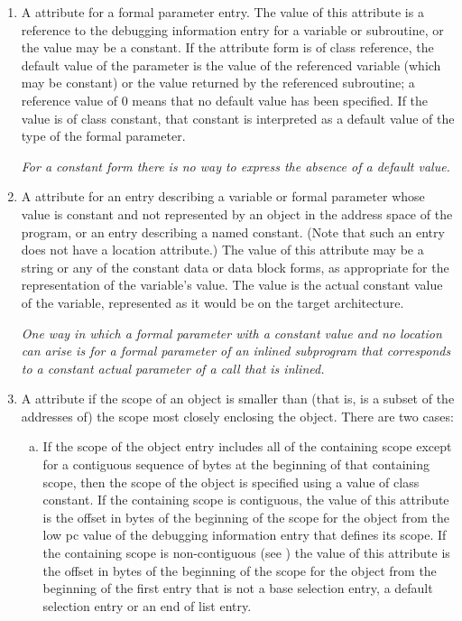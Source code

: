 \begin{enumerate}[1. ]
\item A \DWATdefaultvalue{} attribute 
for 
a formal parameter
\hypertarget{chap:DWATdefaultvaluedefaultvalueofparameter}{}
entry. The value of this attribute is a reference to the
debugging information entry for a variable or subroutine,
or the value may be a constant. If the attribute form is of
class reference, the default value of the parameter is the
value of the referenced variable (which may be constant) or
the value returned by the referenced subroutine; a reference
value of 0 means that no default value has been specified.
If the value is of class constant, that constant is interpreted
as a default value of the type of the formal parameter.

\textit{For a constant form there is no way to 
express the absence of a default value.}

\item A \DWATconstvalue{} attribute 
for 
\hypertarget{chap:DWATconstvalueconstantobject}{}
an entry describing a
variable or formal parameter whose value is constant and not
represented by an object in the address space of the program,
or an entry describing a named constant. (Note that such
an entry does not have a location attribute.) The value of
this attribute may be a string or any of the constant data
or data block forms, 
as appropriate for the representation
of the variable's value. The value is the actual constant
value of the variable, represented as it would be on the
target architecture.  

\textit{One way in which a formal parameter
with a constant value and no location can arise is for a
formal parameter of an inlined subprogram that corresponds
to a constant actual parameter of a call that is inlined.
}

\item A \DWATstartscope{} 
attribute if the scope of 
an
\hypertarget{chap:DWATstartscopeobjectdeclaration}{}
object is smaller than (that is, is a subset of the addresses
of) the scope most closely enclosing the object. There are
two cases:
\begin{enumerate}[a) ]
\item If the scope of the object entry includes all of the
containing scope except for a contiguous sequence of bytes at
the beginning of that containing scope, then the scope of the
object is specified using a value of class constant. If the
containing scope is contiguous, the value of this attribute
is the offset in bytes of the beginning of the scope for the
object from the low pc value of the debugging information
entry that defines its scope. If the containing scope
is non-contiguous 
(see )
the value of this
attribute is the offset in bytes of the beginning of the scope
for the object from the beginning of the first  entry
that is not a base selection entry, a default selection entry or an end of list entry.


\end{enumerate}
\end{enumerate}
